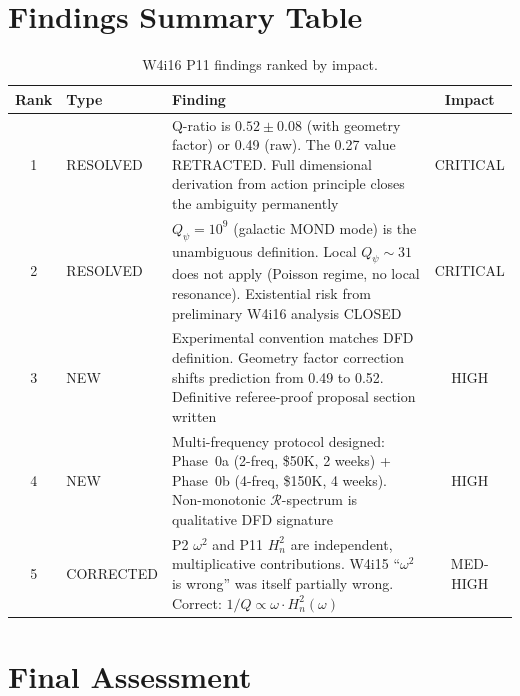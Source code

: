 \documentclass[11pt]{article}
\theoremstyle{definition}
\theoremstyle{remark}
\begin{document}
\section{Findings Summary Table}

\begin{table}[H]
\centering
\caption{W4i16 P11 findings ranked by impact.}
\label{tab:findings_summary}
\renewcommand{\arraystretch}{1.3}
\begin{tabular}{@{}clp{7cm}c@{}}
\toprule
\textbf{Rank} & \textbf{Type} & \textbf{Finding} & \textbf{Impact} \\
\midrule
1 & RESOLVED & Q-ratio is $0.52 \pm 0.08$ (with geometry factor)
  or 0.49 (raw). The 0.27 value RETRACTED. Full dimensional
  derivation from action principle closes the ambiguity permanently &
  CRITICAL \\
2 & RESOLVED & $Q_\psi = 10^9$ (galactic MOND mode) is the unambiguous
  definition. Local $Q_\psi \sim 31$ does not apply (Poisson regime,
  no local resonance). Existential risk from preliminary W4i16
  analysis CLOSED & CRITICAL \\
3 & NEW & Experimental convention matches DFD definition.
  Geometry factor correction shifts prediction from 0.49 to 0.52.
  Definitive referee-proof proposal section written &
  HIGH \\
4 & NEW & Multi-frequency protocol designed: Phase~0a (2-freq,
  \$50K, 2 weeks) + Phase~0b (4-freq, \$150K, 4 weeks). Non-monotonic
  $\mathcal{R}$-spectrum is qualitative DFD signature &
  HIGH \\
5 & CORRECTED & P2 $\omega^2$ and P11 $H_n^2$ are independent,
  multiplicative contributions. W4i15 ``$\omega^2$ is wrong'' was
  itself partially wrong. Correct: $1/Q \propto \omega \cdot H_n^2(\omega)$ &
  MED-HIGH \\
\bottomrule
\end{tabular}
\end{table}


\section{Final Assessment}
\end{document}
